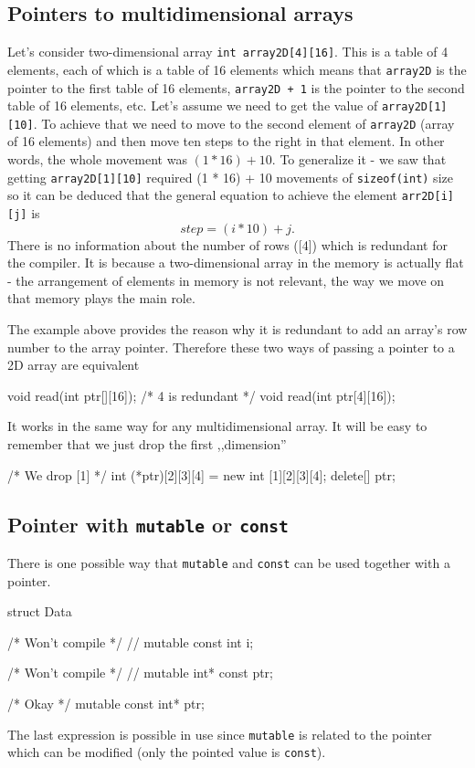 \documentclass[../main]{subfiles}
\begin{document}
\subsection{Pointers to multidimensional arrays}
    Let's consider two-dimensional array \texttt{int array2D[4][16]}. This is a table of 4 elements, each of which is a table of 16 elements which means that \texttt{array2D} is the pointer to
the first table of 16 elements, \texttt{array2D + 1} is the pointer to the second table of 16 elements, etc. Let's assume we need to get the value of \texttt{array2D[1][10]}. To achieve that
we need to move to the second element of \texttt{array2D} (array of 16 elements) and then move ten steps to the right in that element. In other words, the whole movement was $(1 * 16) + 10$.
To generalize it - we saw that getting \texttt{array2D[1][10]} required (1 * 16) + 10 movements of \texttt{sizeof(int)} size so it can be deduced that the general equation to achieve the element
\texttt{arr2D[i][j]} is
\begin{equation*}
    step = (i * 10) + j.
\end{equation*}
\noindent
There is no information about the number of rows ([4]) which is redundant for the compiler. It is because a two-dimensional array in the memory is actually flat - the arrangement of elements in memory is not relevant,
the way we move on that memory plays the main role.\newline

    The example above provides the reason why it is redundant to add an array's row number to the array pointer. Therefore these two ways of passing a pointer to a 2D array are equivalent
\begin{Code}
    void read(int ptr[][16]);
    /* 4 is redundant */
    void read(int ptr[4][16]);
\end{Code}
\noindent
It works in the same way for any multidimensional array. It will be easy to remember that we just drop the first ,,dimension''
\begin{Code}
    /* We drop [1] */
    int (*ptr)[2][3][4] = new int [1][2][3][4];
    delete[] ptr;
\end{Code}

\subsection{Pointer with \texttt{mutable} or \texttt{const}}
    There is one possible way that \texttt{mutable} and \texttt{const} can be used together with a pointer.
\begin{Code}
    struct Data
    {
        /* Won't compile */
        // mutable const int i;

        /* Won't compile */
        // mutable int* const ptr;

        /* Okay */
        mutable const int* ptr;
    }
\end{Code}
\noindent
The last expression is possible in use since \texttt{mutable} is related to the pointer which can be modified (only the pointed value is \texttt{const}).
\end{document}
